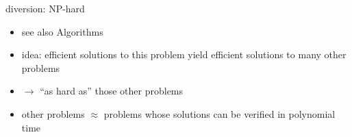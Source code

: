 \begin{frame}{diversion: NP-hard}
    \begin{itemize}
    \item see also Algorithms
    \vspace{.5cm}
    \item idea: efficient solutions to this problem yield efficient solutions to many other problems
    \item $\rightarrow$ ``as hard as'' those other problems
    \vspace{.5cm}
    \item other problems $\approx$ problems whose solutions can be verified in polynomial time
    \end{itemize}
\end{frame}
